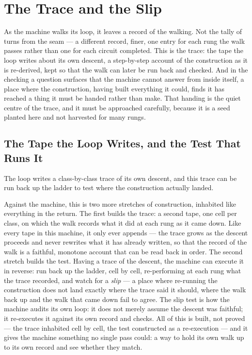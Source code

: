 \chapter{The Trace and the Slip}

As the machine walks its loop, it leaves a record of the walking. Not the tally of turns from the seam ---
a different record, finer, one entry for each rung the walk passes rather than one for each circuit completed.
This is the trace: the tape the loop writes about its own descent, a step-by-step account of the construction as
it is re-derived, kept so that the walk can later be run back and checked. And in the checking a question surfaces
that the machine cannot answer from inside itself, a place where the construction, having built everything it
could, finds it has reached a thing it must be handed rather than make. That handing is the quiet centre of the
trace, and it must be approached carefully, because it is a seed planted here and not harvested for many rungs.

\section{The Tape the Loop Writes, and the Test That Runs It}

The loop writes a class-by-class trace of its own descent, and this trace can be run back up the ladder to test
where the construction actually landed.

Against the machine, this is two more stretches of construction, inhabited like everything in the return. The
first builds the trace: a second tape, one cell per class, on which the walk records what it did at each rung as
it came down. Like every tape in this machine, it only ever appends --- the trace grows as the descent proceeds
and never rewrites what it has already written, so that the record of the walk is a faithful, monotone account
that can be read back in order. The second stretch builds the test. Having a trace of the descent, the machine can
execute it in reverse: run back up the ladder, cell by cell, re-performing at each rung what the trace recorded,
and watch for a \emph{slip} --- a place where re-running the construction does not land exactly where the trace
said it should, where the walk back up and the walk that came down fail to agree. The slip test is how the machine
audits its own loop: it does not merely assume the descent was faithful; it re-executes it against its own record
and checks. All of this is built, not proved --- the trace inhabited cell by cell, the test constructed as a
re-execution --- and it gives the machine something no single pass could: a way to hold its own walk up to its own
record and see whether they match.

